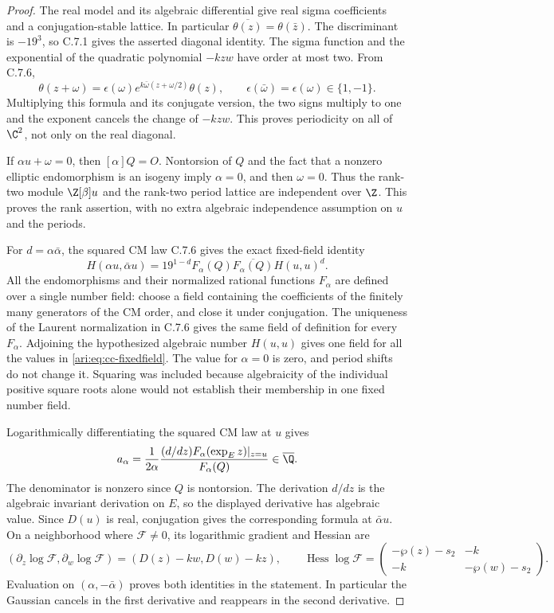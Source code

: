 \begin{proof}
The real model and its algebraic differential give real sigma
coefficients and a conjugation-stable lattice. In particular
$\overline{\theta(z)}=\theta(\bar z)$. The discriminant is
$-19^3$, so C.7.1 gives the asserted diagonal identity.
The sigma function and the exponential of the quadratic
polynomial $-kzw$ have order at most two. From C.7.6,
\[
 \theta(z+\omega)=\epsilon(\omega)
         e^{k\bar\omega(z+\omega/2)}\theta(z),
 \qquad \epsilon(\bar\omega)=\epsilon(\omega)\in\{1,-1\}.
\]
Multiplying this formula and its conjugate version, the two
signs multiply to one and the exponent cancels the change of
$-kzw$. This proves periodicity on all of $\C^2$, not only
on the real diagonal.

If $\alpha u+\omega=0$, then $[\alpha]Q=O$.
Nontorsion of $Q$ and the fact that a nonzero elliptic
endomorphism is an isogeny imply $\alpha=0$, and then
$\omega=0$. Thus the rank-two module $\Z[\beta]u$ and the
rank-two period lattice are independent over $\Z$.
This proves the rank assertion, with no extra algebraic
independence assumption on $u$ and the periods.

For $d=\alpha\bar\alpha$, the squared CM law C.7.6 gives
the exact fixed-field identity
\begin{equation}\label{ari:eq:cc-fixedfield}
 H(\alpha u,\bar\alpha u)
   =19^{1-d}F_\alpha(Q)\overline{F_\alpha(Q)}H(u,u)^d.
\end{equation}
All the endomorphisms and their normalized rational functions
$F_\alpha$ are defined over a single number field: choose
a field containing the coefficients of the finitely many
generators of the CM order, and close it under conjugation.
The uniqueness of the Laurent normalization in C.7.6 gives
the same field of definition for every $F_\alpha$.
Adjoining the hypothesized algebraic number $H(u,u)$ gives
one field for all the values in \eqref{ari:eq:cc-fixedfield}.
The value for $\alpha=0$ is zero, and period shifts do not
change it. Squaring was included because algebraicity of the
individual positive square roots alone would not establish
their membership in one fixed number field.

Logarithmically differentiating the squared CM law at $u$
gives
\[
 a_\alpha=\frac{1}{2\alpha}
     \frac{(d/dz)F_\alpha(\exp_Ez)|_{z=u}}{F_\alpha(Q)}
                  \in\overline{\Q}.
\]
The denominator is nonzero since $Q$ is nontorsion. The
derivation $d/dz$ is the algebraic invariant derivation on
$E$, so the displayed derivative has algebraic value.
Since $D(u)$ is real, conjugation gives the corresponding
formula at $\bar\alpha u$. On a neighborhood where
$\mathcal F\ne0$, its logarithmic gradient and Hessian are
\[
 (\partial_z\log\mathcal F,\partial_w\log\mathcal F)
       =(D(z)-kw,D(w)-kz),\qquad
 \operatorname{Hess}\log\mathcal F=
 \begin{pmatrix}-\wp(z)-s_2&-k\\-k&-\wp(w)-s_2\end{pmatrix}.
\]
Evaluation on $(\alpha,-\bar\alpha)$ proves both identities
in the statement. In particular the Gaussian cancels in the
first derivative and reappears in the second derivative.


\end{proof}
